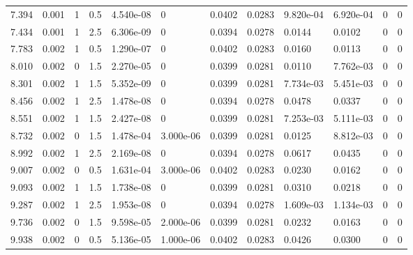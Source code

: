 \documentclass[preview]{standalone}
\begin{document}
{{\begin{tabular}{L{1.2cm}C{1.2cm} C{0.3cm}C{0.5cm} C{1.4cm}C{1.4cm} C{1.4cm}C{1.4cm} C{1.6cm}C{1.6cm} C{1.6cm}C{1.6cm}}
  7.394  &  0.001  & 1     & 0.5 &  4.540e-08  & 0  &  0.0402&   0.0283& 9.820e-04 & 6.920e-04   &  0 & 0  \\ 
  7.434  &  0.001  & 1     & 2.5 &  6.306e-09  & 0  &  0.0394&   0.0278& 0.0144 & 0.0102   &  0 & 0  \\ 
  7.783  &  0.002  & 1     & 0.5 &  1.290e-07  & 0  &  0.0402&   0.0283& 0.0160 & 0.0113   &  0 & 0  \\ 
  8.010  &  0.002  & 0     & 1.5 &  2.270e-05  & 0  &  0.0399&   0.0281& 0.0110 & 7.762e-03   &  0 & 0  \\ 
  8.301  &  0.002  & 1     & 1.5 &  5.352e-09  & 0  &  0.0399&   0.0281& 7.734e-03 & 5.451e-03   &  0 & 0  \\ 
  8.456  &  0.002  & 1     & 2.5 &  1.478e-08  & 0  &  0.0394&   0.0278& 0.0478 & 0.0337   &  0 & 0  \\ 
  8.551  &  0.002  & 1     & 1.5 &  2.427e-08  & 0  &  0.0399&   0.0281& 7.253e-03 & 5.111e-03   &  0 & 0  \\ 
  8.732  &  0.002  & 0     & 1.5 &  1.478e-04  & 3.000e-06  &  0.0399&   0.0281& 0.0125 & 8.812e-03   &  0 & 0  \\ 
  8.992  &  0.002  & 1     & 2.5 &  2.169e-08  & 0  &  0.0394&   0.0278& 0.0617 & 0.0435   &  0 & 0  \\ 
  9.007  &  0.002  & 0     & 0.5 &  1.631e-04  & 3.000e-06  &  0.0402&   0.0283& 0.0230 & 0.0162   &  0 & 0  \\ 
  9.093  &  0.002  & 1     & 1.5 &  1.738e-08  & 0  &  0.0399&   0.0281& 0.0310 & 0.0218   &  0 & 0  \\ 
  9.287  &  0.002  & 1     & 2.5 &  1.953e-08  & 0  &  0.0394&   0.0278& 1.609e-03 & 1.134e-03   &  0 & 0  \\ 
  9.736  &  0.002  & 0     & 1.5 &  9.598e-05  & 2.000e-06  &  0.0399&   0.0281& 0.0232 & 0.0163   &  0 & 0  \\ 
  9.938  &  0.002  & 0     & 0.5 &  5.136e-05  & 1.000e-06  &  0.0402&   0.0283& 0.0426 & 0.0300   &  0 & 0  \\ 
\hline 
\end{tabular} 

}}
\end{document}
